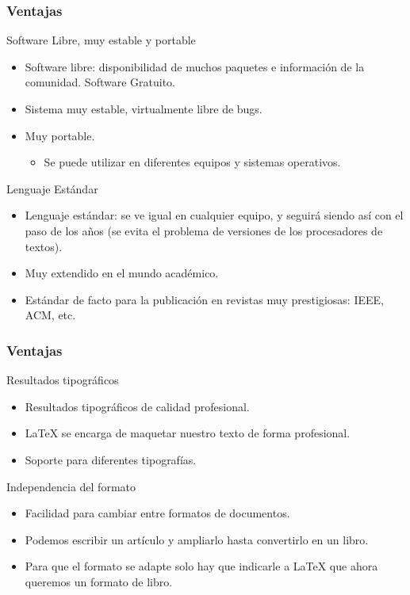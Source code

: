 \documentclass[aspectratio=43]{beamer}%
\begin{document}
\begin{frame}[fragile]
\frametitle{\textbf{Ventajas}}
\justifying
 \begin{block}{Software Libre, muy estable y portable}
\begin{itemize}\justifying
  \item Software libre: disponibilidad de muchos paquetes e información de la comunidad. Software Gratuito.
  \item Sistema muy estable, virtualmente libre de bugs.
  \item Muy portable.
  \begin{itemize}\justifying
  \item Se puede utilizar en diferentes equipos y sistemas operativos.
\end{itemize}

\end{itemize}

\end{block}
\begin{block}{Lenguaje Estándar}
\begin{itemize}\justifying
  \item Lenguaje estándar: se ve igual en cualquier equipo, y seguirá siendo así con el paso de los años (se evita el problema de versiones de los procesadores de textos).
  \item Muy extendido en el mundo académico.
  \item Estándar de facto para la publicación en revistas muy prestigiosas: IEEE, ACM, etc.
\end{itemize}

\end{block}

\end{frame}

\begin{frame}[fragile]
\frametitle{\textbf{Ventajas}}
\justifying
 \begin{block}{Resultados tipográficos}
\begin{itemize}\justifying
  \item Resultados tipográficos de calidad profesional.
  \item \LaTeX{} se encarga de maquetar nuestro texto de forma profesional.
  \item Soporte para diferentes tipografías.
\end{itemize}

\end{block}
\begin{block}{Independencia del formato}
\begin{itemize}\justifying
  \item Facilidad para cambiar entre formatos de documentos.
  \item Podemos escribir un artículo y ampliarlo hasta convertirlo en un libro.
  \item Para que el formato se adapte solo hay que indicarle a \LaTeX{} que ahora queremos un formato de libro.
\end{itemize}

\end{block}

\end{frame}
\end{document}
